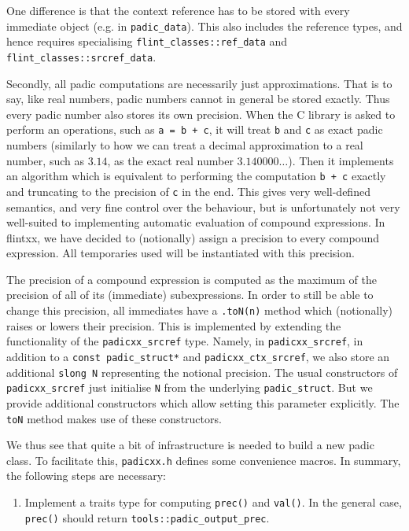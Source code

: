 \documentclass[a4paper,10pt]{book}
\newcommand{\code}{\lstinline}
\begin{document}
{{One difference is that the context reference has to be stored with every
immediate object (e.g. in \code{padic_data}). This also includes the reference
types, and hence requires specialising \code{flint_classes::ref_data} and
\code{flint_classes::srcref_data}.

Secondly, all padic computations are necessarily just approximations. That is to
say, like real numbers, padic numbers cannot in general be stored exactly. Thus
every padic number also stores its own precision. When the C library is asked to
perform an operations, such as \code{a = b + c}, it will treat \code{b} and
\code{c} as exact padic numbers (similarly to how we can treat a decimal
approximation to a real number, such as $3.14$, as the exact real number
$3.140000\dots$). Then it implements an algorithm which is equivalent to
performing the computation \code{b + c} exactly and truncating to the precision
of \code{c} in the end. This gives very well-defined semantics, and very fine
control over the behaviour, but is unfortunately not very well-suited to
implementing automatic evaluation of compound expressions. In flintxx, we have
decided to (notionally) assign a precision to every compound expression. All
temporaries used will be instantiated with this precision.

The precision of a compound expression is computed as the maximum of the
precision of all of its (immediate) subexpressions. In order to still be able to
change this precision, all immediates have a \code{.toN(n)} method which
(notionally) raises or lowers their precision. This is implemented by extending
the functionality of the \code{padicxx_srcref} type. Namely, in
\code{padicxx_srcref}, in addition to a \code{const padic_struct*} and
\code{padicxx_ctx_srcref}, we also store an additional \code{slong N}
representing the notional precision. The usual constructors of
\code{padicxx_srcref} just initialise \code{N} from the underlying
\code{padic_struct}. But we provide additional constructors which allow setting
this parameter explicitly. The \code{toN} method makes use of these
constructors.

We thus see that quite a bit of infrastructure is needed to build a new padic
class. To facilitate this, \code{padicxx.h} defines some convenience macros. In
summary, the following steps are necessary:

\begin{enumerate}
\item Implement a traits type for computing \code{prec()} and \code{val()}.
  In the general case, \code{prec()} should return
  \code{tools::padic_output_prec}.


\end{enumerate}}}
\end{document}
